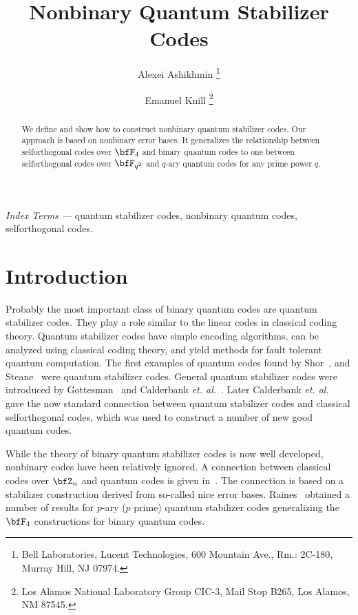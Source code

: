 \documentclass{article}
\begin{document}
 
\twocolumn

 

\title       { Nonbinary Quantum Stabilizer Codes }

\author      { Alexei Ashikhmin
\thanks {Bell Laboratories, Lucent Technologies, 
  600 Mountain Ave., Rm.: 2C-180,
  Murray Hill, NJ 07974. } \and 
Emanuel  Knill
\thanks { Los Alamos National Laboratory 
  Group CIC-3, Mail Stop B265, 
Los Alamos, NM 87545. 
}
}
\date{}
\maketitle
\begin{abstract}
We define and show how to construct nonbinary quantum stabilizer
codes. Our approach is based on nonbinary error bases. It
generalizes the relationship between selforthogonal codes over $\bfF_{4}$
and binary quantum codes to one between selforthogonal codes over
$\bfF_{q^2}$ and $q$-ary quantum codes for any prime power $q$.
\end{abstract}
 
{\em Index Terms ---}  quantum stabilizer codes, nonbinary quantum
codes, selforthogonal codes.

\section{Introduction}

Probably the most important class of binary quantum codes are quantum
stabilizer codes. They play a role similar to the linear codes in
classical coding theory.  Quantum stabilizer codes have simple
encoding algorithms, can be analyzed using classical coding theory,
and yield methods for fault tolerant quantum computation.
The first examples of quantum codes found by Shor~\cite{shor95},
and Steane~\cite{stean96_1,stean96_2} were quantum stabilizer
codes. General quantum stabilizer codes were introduced by
Gottesman~\cite{Gottesman96} and Calderbank
\emph{et. al.}~\cite{Calderbank97}. Later Calderbank
\emph{et. al.}~\cite{Calderbank98} gave the now standard connection
between quantum stabilizer codes and classical selforthogonal codes,
which was used to construct a number of new good quantum codes.

While the theory of binary quantum stabilizer codes is now well
developed, nonbinary codes have been relatively ignored.  A connection
between classical codes over $\bfZ_n$ and quantum codes is given
in~\cite{Knill96_1,Knill96_2}. The connection is based on a
stabilizer construction derived from so-called nice error
bases. Raines~\cite{rains} obtained a number of results for $p$-ary
($p$ prime) quantum stabilizer codes generalizing the $\bfF_{4}$
constructions for binary quantum codes.
\end{document}
